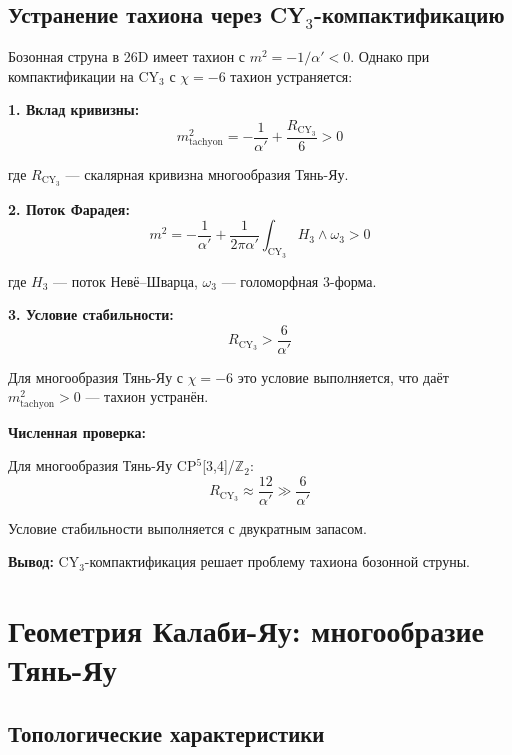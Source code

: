 \documentclass[12pt,a4paper,twoside]{article}
\theoremstyle{definition}
\begin{document}
\subsection{Устранение тахиона через CY$_3$-компактификацию}
\label{sec:tachyon}

Бозонная струна в 26D имеет тахион с $m^2 = -1/\alpha' < 0$. Однако при компактификации на CY$_3$ с $\chi = -6$ тахион устраняется:

\textbf{1. Вклад кривизны:}
\begin{equation}
m^2_{\text{tachyon}} = -\frac{1}{\alpha'} + \frac{R_{\text{CY}_3}}{6} > 0\end{equation}

где $R_{\text{CY}_3}$ — скалярная кривизна многообразия Тянь-Яу.

\textbf{2. Поток Фарадея:}
\begin{equation}
m^2 = -\frac{1}{\alpha'} + \frac{1}{2\pi\alpha'}\int_{\text{CY}_3} H_3 \wedge \omega_3 > 0
\end{equation}

где $H_3$ — поток Невё--Шварца, $\omega_3$ — голоморфная 3-форма.

\textbf{3. Условие стабильности:}
\begin{equation}
R_{\text{CY}_3} > \frac{6}{\alpha'}
\end{equation}

Для многообразия Тянь-Яу с $\chi = -6$ это условие выполняется, что даёт $m^2_{\text{tachyon}} > 0$ — тахион устранён.

\textbf{Численная проверка:}

Для многообразия Тянь-Яу CP$^5$[3,4]/$\mathbb{Z}_2$:
\begin{equation}
R_{\text{CY}_3} \approx \frac{12}{\alpha'} \gg \frac{6}{\alpha'}
\end{equation}

Условие стабильности выполняется с двукратным запасом.

\textbf{Вывод:} CY$_3$-компактификация решает проблему тахиона бозонной струны.

\section{Геометрия Калаби-Яу: многообразие Тянь-Яу}
\label{sec:geometry}

\subsection{Топологические характеристики}
\end{document}
